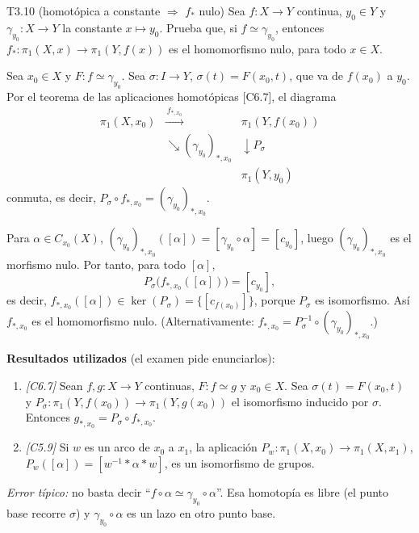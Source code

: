 \begin{ejercicio}{T3.10 (homotópica a constante $\Rightarrow$ $f_*$ nulo)}
Sea $f \colon X \to Y$ continua, $y_0 \in Y$ y $\gamma_{y_0} \colon X \to Y$ la constante $x \mapsto y_0$. Prueba que, si $f \simeq \gamma_{y_0}$, entonces $f_* \colon \pi_1(X,x) \to \pi_1(Y,f(x))$ es el homomorfismo nulo, para todo $x \in X$.

\sol {} \quad {}

Sea $x_0 \in X$ y $F \colon f \simeq \gamma_{y_0}$. Sea $\sigma \colon I \to Y$, $\sigma(t) = F(x_0,t)$, que va de $f(x_0)$ a $y_0$. Por el teorema de las aplicaciones homotópicas [C6.7], el diagrama
\[ \begin{array}{ccc} \pi_1(X,x_0) & \xrightarrow{\ f_{*,x_0}\ } & \pi_1(Y,f(x_0)) \\ & \searrow{\scriptstyle (\gamma_{y_0})_{*,x_0}} & \downarrow{\scriptstyle P_\sigma} \\ & & \pi_1(Y,y_0) \end{array} \]
conmuta, es decir, $P_\sigma \circ f_{*,x_0} = (\gamma_{y_0})_{*,x_0}$.

Para $\alpha \in C_{x_0}(X)$, $(\gamma_{y_0})_{*,x_0}([\alpha]) = [\gamma_{y_0} \circ \alpha] = [c_{y_0}]$, luego $(\gamma_{y_0})_{*,x_0}$ es el morfismo nulo. Por tanto, para todo $[\alpha]$,
\[ P_\sigma\big(f_{*,x_0}([\alpha])\big) = [c_{y_0}], \]
es decir, $f_{*,x_0}([\alpha]) \in \ker(P_\sigma) = \{[c_{f(x_0)}]\}$, porque $P_\sigma$ es isomorfismo. Así $f_{*,x_0}$ es el homomorfismo nulo. (Alternativamente: $f_{*,x_0} = P_\sigma^{-1} \circ (\gamma_{y_0})_{*,x_0}$.)

\textbf{Resultados utilizados} (el examen pide enunciarlos):
\begin{enumerate}
    \item[(a)] \emph{[C6.7]} Sean $f,g \colon X \to Y$ continuas, $F \colon f \simeq g$ y $x_0 \in X$. Sea $\sigma(t) = F(x_0,t)$ y $P_\sigma \colon \pi_1(Y,f(x_0)) \to \pi_1(Y,g(x_0))$ el isomorfismo inducido por $\sigma$. Entonces $g_{*,x_0} = P_\sigma \circ f_{*,x_0}$.
    \item[(b)] \emph{[C5.9]} Si $w$ es un arco de $x_0$ a $x_1$, la aplicación $P_w \colon \pi_1(X,x_0) \to \pi_1(X,x_1)$, $P_w([\alpha]) = [w^{-1} * \alpha * w]$, es un isomorfismo de grupos.
\end{enumerate}

\emph{Error típico:} no basta decir ``$f \circ \alpha \simeq \gamma_{y_0} \circ \alpha$''. Esa homotopía es libre (el punto base recorre $\sigma$) y $\gamma_{y_0} \circ \alpha$ es un lazo en otro punto base.
\end{ejercicio}

